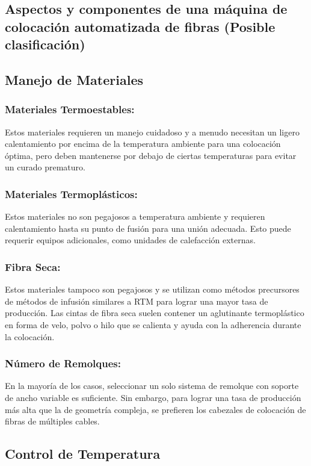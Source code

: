 \begin{enumerate}[label=\arabic*.]
\section{Aspectos y componentes de una máquina de colocación automatizada de fibras (Posible clasificación)}

\subsection{Manejo de Materiales}

\subsubsection{Materiales Termoestables:}
Estos materiales requieren un manejo cuidadoso y a menudo necesitan un ligero calentamiento por encima de la temperatura ambiente para una colocación óptima, pero deben mantenerse por debajo de ciertas temperaturas para evitar un curado prematuro.

\subsubsection{Materiales Termoplásticos:}
Estos materiales no son pegajosos a temperatura ambiente y requieren calentamiento hasta su punto de fusión para una unión adecuada. Esto puede requerir equipos adicionales, como unidades de calefacción externas.

\subsubsection{Fibra Seca:}
Estos materiales tampoco son pegajosos y se utilizan como métodos precursores de métodos de infusión similares a RTM para lograr una mayor tasa de producción. Las cintas de fibra seca suelen contener un aglutinante termoplástico en forma de velo, polvo o hilo que se calienta y ayuda con la adherencia durante la colocación.

\subsubsection{Número de Remolques:}
En la mayoría de los casos, seleccionar un solo sistema de remolque con soporte de ancho variable es suficiente. Sin embargo, para lograr una tasa de producción más alta que la de geometría compleja, se prefieren los cabezales de colocación de fibras de múltiples cables.

\subsection{Control de Temperatura}


\end{enumerate}
